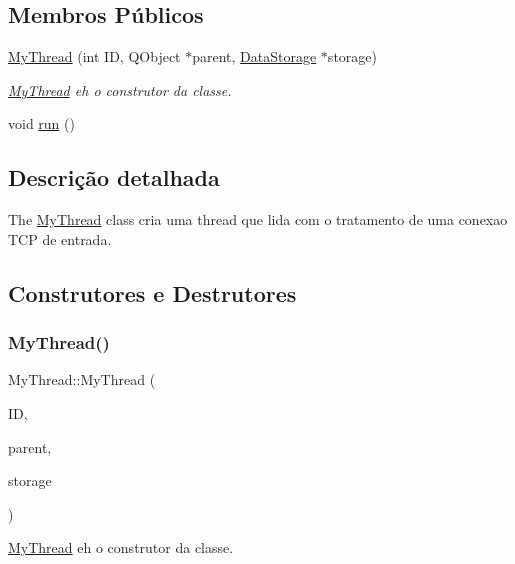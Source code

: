 \subsection*{Membros Públicos}
\begin{DoxyCompactItemize}
\item 
\mbox{\hyperlink{class_my_thread_ac1b04b0fa6b32038e810c7105ef762f6}{My\+Thread}} (int ID, Q\+Object $\ast$parent, \mbox{\hyperlink{class_data_storage}{Data\+Storage}} $\ast$storage)
\begin{DoxyCompactList}\small\item\em \mbox{\hyperlink{class_my_thread}{My\+Thread}} eh o construtor da classe. \end{DoxyCompactList}\item 
void \mbox{\hyperlink{class_my_thread_a48f2e366e852087c53705f64e1ee65c2}{run}} ()
\end{DoxyCompactItemize}


\subsection{Descrição detalhada}
The \mbox{\hyperlink{class_my_thread}{My\+Thread}} class cria uma thread que lida com o tratamento de uma conexao T\+CP de entrada. 

\subsection{Construtores e Destrutores}
\mbox{\label{class_my_thread_ac1b04b0fa6b32038e810c7105ef762f6}} 
\subsubsection{\texorpdfstring{My\+Thread()}{MyThread()}}
{\footnotesize\ttfamily My\+Thread\+::\+My\+Thread (\begin{DoxyParamCaption}\item[{int}]{ID,  }\item[{Q\+Object $\ast$}]{parent,  }\item[{\mbox{\hyperlink{class_data_storage}{Data\+Storage}} $\ast$}]{storage }\end{DoxyParamCaption})}



\mbox{\hyperlink{class_my_thread}{My\+Thread}} eh o construtor da classe. 


